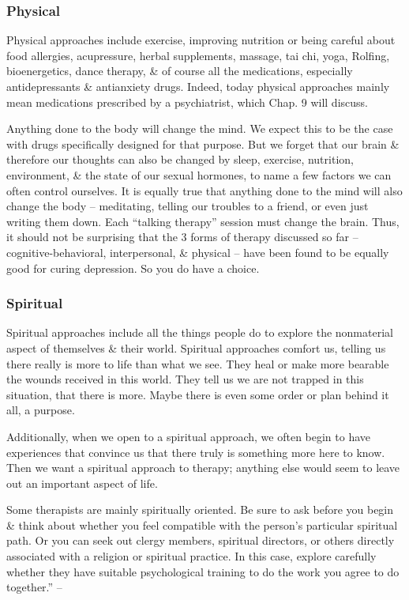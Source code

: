 \documentclass{article}
\numberwithin{equation}{section}
\begin{document}
\subsubsection{Physical}
Physical approaches include exercise, improving nutrition or being careful about food allergies, acupressure, herbal supplements, massage, tai chi, yoga, Rolfing, bioenergetics, dance therapy, \& of course all the medications, especially antidepressants \& antianxiety drugs. Indeed, today physical approaches mainly mean medications prescribed by a psychiatrist, which Chap. 9 will discuss.

Anything done to the body will change the mind. We expect this to be the case with drugs specifically designed for that purpose. But we forget that our brain \& therefore our thoughts can also be changed by sleep, exercise, nutrition, environment, \& the state of our sexual hormones, to name a few factors we can often control ourselves. It is equally true that anything done to the mind will also change the body -- meditating, telling our troubles to a friend, or even just writing them down. Each ``talking therapy'' session must change the brain. Thus, it should not be surprising that the 3 forms of therapy discussed so far -- cognitive-behavioral, interpersonal, \& physical -- have been found to be equally good for curing depression. So you do have a choice.

\subsubsection{Spiritual}
Spiritual approaches include all the things people do to explore the nonmaterial aspect of themselves \& their world. Spiritual approaches comfort us, telling us there really is more to life than what we see. They heal or make more bearable the wounds received in this world. They tell us we are not trapped in this situation, that there is more. Maybe there is even some order or plan behind it all, a purpose.

Additionally, when we open to a spiritual approach, we often begin to have experiences that convince us that there truly is something more here to know. Then we want a spiritual approach to therapy; anything else would seem to leave out an important aspect of life.

Some therapists are mainly spiritually oriented. Be sure to ask before you begin \& think about whether you feel compatible with the person's particular spiritual path. Or you can seek out clergy members, spiritual directors, or others directly associated with a religion or spiritual practice. In this case, explore carefully whether they have suitable psychological training to do the work you agree to do together.'' -- \cite[pp. 205--208]{Aron2013}
\end{document}
